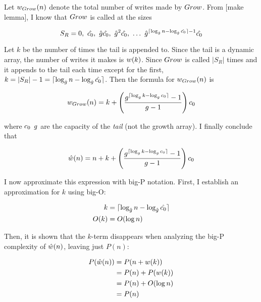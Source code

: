 Let ${w}_{Grow}(n)$ denote the total number of writes made by $Grow$. From [make lemma], I know that $Grow$ is called at the sizes

$$
S_R = 0,\ \VarInitCapacityNew,\ \VarGrowthFactorNew\VarInitCapacityNew,\ \VarGrowthFactorNew^2\VarInitCapacityNew,\ \ldots\ \VarGrowthFactorNew^{\lceil \log_{\VarGrowthFactorNew} n - \log_{\VarGrowthFactorNew} \VarInitCapacityNew \rceil - 1}\VarInitCapacityNew
$$

Let $k$ be the number of times the tail is appended to. Since the tail is a dynamic array, the number of writes it makes is $w(k)$. Since $Grow$ is called $|S_R|$ times and it appends to the tail each time except for the first, $k = |S_R| - 1 = \lceil \log_{\hat{g}} n - \log_{\hat{g}} \hat{c_0} \rceil$. Then the formula for ${w}_{Grow}(n)$ is

$$
{w}_{Grow}(n) = k + \left( \frac{g^{\lceil \log_{g} k - \log_{g} c_0 \rceil} - 1}{g - 1} \right) c_0
$$

where $c_0$ $g$ are the capacity of the \textit{tail} (not the growth array). I finally conclude that

$$
\hat{w}(n) = n + k + \left( \frac{g^{\lceil \log_{g} k - \log_{g} c_0 \rceil} - 1}{g - 1} \right) c_0
$$

I now approximate this expression with big-P notation. First, I establish an approximation for $k$ using big-O:

\begin{align*}
k &= \lceil \log_{\hat{g}} n - \log_{\hat{g}} \hat{c_0} \rceil\\
O(k) &= O(\log n)
\end{align*}

Then, it is shown that the $k$-term disappears when analyzing the big-P complexity of $\hat{w}(n)$, leaving just $P(n)$:

\begin{align*}
P(\hat{w}(n)) &= P(n + w(k))\\
&= P(n) + P(w(k))\\
&= P(n) + O(\log n)\\
&= P(n)
\end{align*}

\HdrSpaceComplex

